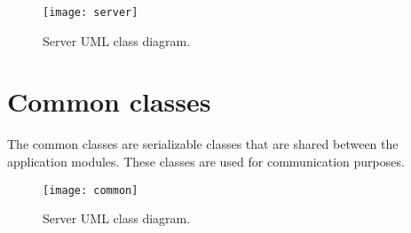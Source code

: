 \begin{figure}[!h]
	\texttt{[image: server]}
	\caption{Server UML class diagram.}\label{fig:server}
\end{figure}

\section{Common classes}\label{sec:common}

The common classes are serializable classes that are shared between the
application modules. These classes are used for communication purposes.


\begin{figure}[!h]
	\texttt{[image: common]}
	\caption{Server UML class diagram.}\label{fig:common}
\end{figure}
